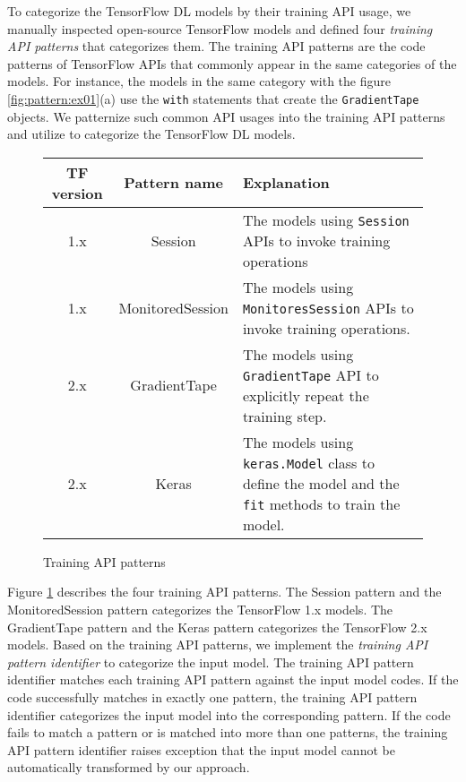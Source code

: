 To categorize the TensorFlow DL models by their training API usage,
we manually inspected open-source TensorFlow models and
defined four \textit{training API patterns} that categorizes them.
The training API patterns are the code patterns of TensorFlow APIs 
that commonly appear in the same categories of the models.
For instance, the models in the same category with the figure
\ref{fig:pattern:ex01}(a) use the {\tt with} statements that create the
{\tt GradientTape} objects.
We patternize such common API usages into the training API patterns and
utilize to categorize the TensorFlow DL models.

\begin{figure}[ht!]
  \centering
  \begin{tabular}{|c|c|l|}
    \hline
    TF version & Pattern name & Explanation \\
    \hline
    1.x & Session & 
	  The models using {\tt Session} APIs to invoke training operations\\
    \hline
    1.x & MonitoredSession & 
	  The models using {\tt MonitoresSession} APIs to invoke 
	  training operations.\\
    \hline
    2.x & GradientTape & 
	  The models using {\tt GradientTape} API to explicitly 
	  repeat the training step.\\
    \hline
    2.x & Keras & 
	  The models using {\tt keras.Model} class to define the model
	  and the {\tt fit} methods to train the model.\\
    \hline
  \end{tabular}
  \caption{Training API patterns}
  \label{tab:patterns}
\end{figure}

Figure \ref{tab:patterns} describes the four training API patterns.
The Session pattern and the MonitoredSession pattern categorizes the
TensorFlow 1.x models. The GradientTape pattern and the Keras pattern
categorizes the TensorFlow 2.x models.
Based on the training API patterns,
we implement the \textit{training API pattern identifier} to
categorize the input model.
The training API pattern identifier matches each training API pattern
against the input model codes. 
If the code successfully matches in exactly one pattern,
the training API pattern identifier categorizes the input model into
the corresponding pattern.
If the code fails to match a pattern or is matched into more than one patterns,
the training API pattern identifier raises exception that the input model
cannot be automatically transformed by our approach.

